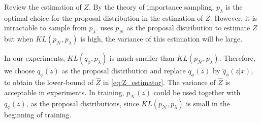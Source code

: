 Review the estimation of $Z$. By the theory of importance sampling, $p_\lambda$ is the optimal choice for the proposal distribution in the estimation of $Z$. However, it is intractable to sample from $p_\lambda$. 
\cite{bauer2019resampled} uses $p_\mathcal{N}$ as the proposal distribution to estimate $Z$ but when $KL(p_\mathcal{N}, p_\lambda)$ is high, the variance of this estimation will be large. 

In our experiments, $KL(q_\phi, p_\lambda)$ is much smaller than $KL(p_\mathcal{N}, p_\lambda)$. Therefore, we choose $q_\phi(z)$ as the proposal distribution and replace $q_\phi(z)$ by $\hat{q}_\phi(z|x)$, to obtain the lower-bound of $\hat{Z}$ in \cref{eq:Z_estimator}. The variance of $\hat{Z}$ is acceptable in experiments.  
In training, $p_\mathcal{N}(z)$ could be used together with $q_\phi(z)$, as the proposal distributions, since $KL(p_\mathcal{N}, p_\lambda)$ is small in the beginning of training.
 